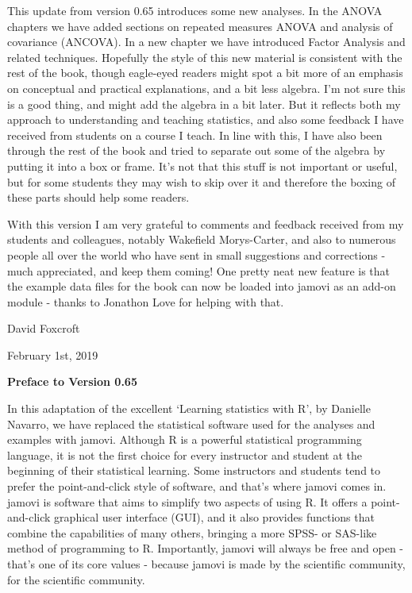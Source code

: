 \noindent
This update from version 0.65 introduces some new analyses. In the ANOVA chapters we have added sections on repeated measures ANOVA and analysis of covariance (ANCOVA). In a new chapter we have introduced Factor Analysis and related techniques. Hopefully the style of this new material is consistent with the rest of the book, though eagle-eyed readers might spot a bit more of an emphasis on conceptual and practical explanations, and a bit less algebra. I'm not sure this is a good thing, and might add the algebra in a bit later. But it reflects both my approach to understanding and teaching statistics, and also some feedback I have received from students on a course I teach. In line with this, I have also been through the rest of the book and tried to separate out some of the algebra by putting it into a box or frame. It's not that this stuff is not important or useful, but for some students they may wish to skip over it and therefore the boxing of these parts should help some readers. 

With this version I am very grateful to comments and feedback received from my students and colleagues, notably Wakefield Morys-Carter, and also to numerous people all over the world who have sent in small suggestions and corrections - much appreciated, and keep them coming! One pretty neat new feature is that the example data files for the book can now be loaded into jamovi as an add-on module - thanks to Jonathon Love for helping with that.

\vspace*{24pt}
\noindent
David Foxcroft 

\noindent
February 1st, 2019

\vspace*{30pt}


\begin{center}{\Large {\bf Preface to Version 0.65}}\end{center}
\vspace*{12pt}

\noindent
In this adaptation of the excellent `Learning statistics with R', by Danielle Navarro, we have replaced the statistical software used for the analyses and examples with jamovi. Although R is a powerful statistical programming language, it is not the first choice for every instructor and student at the beginning of their statistical learning. Some instructors and students tend to prefer the point-and-click style of software, and that's where jamovi comes in. jamovi is software that aims to simplify two aspects of using R. It offers a point-and-click graphical user interface (GUI), and it also provides functions that combine the capabilities of many others, bringing a more SPSS- or SAS-like method of programming to R. Importantly, jamovi will always be free and open - that's one of its core values - because jamovi is made by the scientific community, for the scientific community.

